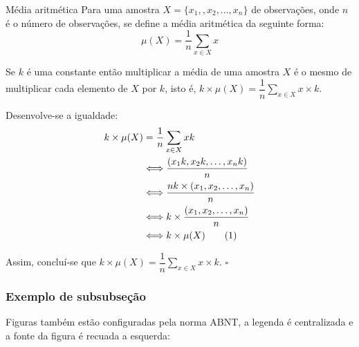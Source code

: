 \documentclass[courier]{uninove-ppgi}
\newcommand{\numberequation}[1]{\addtocounter{equation}{#1}\tag{\theequation}}
\begin{document}
    \begin{definicao}{Média aritmética}
    Para uma amostra $ X=\{x_1,, x_2, \ldots,x_n\} $ de observações, onde $ n $ é o número de observações, se define a média aritmética da seguinte forma:
    \begin{equation}
    \mu(X)=\dfrac{1}{n}\sum\limits_{x \in X}x
    \end{equation}
    \end{definicao}
    \begin{proposicao}
    Se $ k $ é uma constante então multiplicar a média de uma amostra $ X $ é o mesmo de multiplicar cada elemento de $ X $ por $ k $, isto é, $ k \times \mu(X) = \dfrac{1}{n} \sum\limits_{x \in X}x\times k $.
    \end{proposicao}
    \begin{prova}
    Desenvolve-se a igualdade:
    \begin{align*}
    k \times \mu(X) &= \dfrac{1}{n} \sum\limits_{x \in X}xk \\
    & \Longleftrightarrow  \dfrac{(x_1k,x_2k, \ldots, x_nk)}{n} \\
    & \Longleftrightarrow  \dfrac{nk \times (x_1,x_2, \ldots, x_n)}{n} \\
    & \Longleftrightarrow   k \times \dfrac{(x_1,x_2, \ldots, x_n)}{n} \\
    & \Longleftrightarrow   k \times \mu(X) \numberequation{1}
    \end{align*}
    \end{prova}
    Assim, concluí-se que $ k \times \mu(X) = \dfrac{1}{n} \sum\limits_{x \in X}x\times k $. $ \square $
     
    \subsubsection{Exemplo de subsubseção}
    
    Figuras também estão configuradas pela norma ABNT, a legenda é centralizada e a fonte da figura é recuada a esquerda:
    
\end{document}
